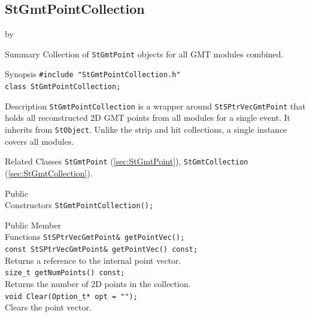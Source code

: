 \documentclass[twoside]{article}
\newcommand{\entrylabel}[1]{\mbox{\textbf{{#1}}}\hfil}%
\newenvironment{entry}
{\begin{list}{}%
    {\renewcommand{\makelabel}{\entrylabel}%
     \setlength{\labelwidth}{90pt}%
     \setlength{\leftmargin}{\labelwidth}
     \advance\leftmargin by \labelsep%
      }%
    }%
  {\end{list}}
\newcommand{\Entrylabel}[1]%
{\raisebox{0pt}[1ex][0pt]{\makebox[\labelwidth][l]%
    {\parbox[t]{\labelwidth}{\hspace{0pt}\textbf{{#1}}}}}}
\newenvironment{Entry}%
{\renewcommand{\entrylabel}{\Entrylabel}\begin{entry}}%
  {\end{entry}}
\begin{document}
\subsection{StGmtPointCollection}
\label{sec:StGmtPointCollection}
\begin{Entry}
\item[Summary] Collection of \texttt{StGmtPoint} objects for all GMT modules combined.
\item[Synopsis]
    \verb+#include "StGmtPointCollection.h"+\\
    \verb+class StGmtPointCollection;+\\
\item[Description]
    \texttt{StGmtPointCollection} is a wrapper around \texttt{StSPtrVecGmtPoint}
    that holds all reconstructed 2D GMT points from all modules for a single
    event.  It inherits from \texttt{StObject}.  Unlike the strip and hit
    collections, a single instance covers all modules.
\item[Related Classes]
    \texttt{StGmtPoint} (\ref{sec:StGmtPoint}),
    \texttt{StGmtCollection} (\ref{sec:StGmtCollection}).
\item[Public\\ Constructors]
    \verb+StGmtPointCollection();+\\
\item[Public Member\\ Functions]
    \verb+StSPtrVecGmtPoint& getPointVec();+\\
    \verb+const StSPtrVecGmtPoint& getPointVec() const;+\\
    Returns a reference to the internal point vector.\\
    \verb+size_t getNumPoints() const;+\\
    Returns the number of 2D points in the collection.\\
    \verb+void Clear(Option_t* opt = "");+\\
    Clears the point vector.\\
\end{Entry}
\clearpage

\end{document}
